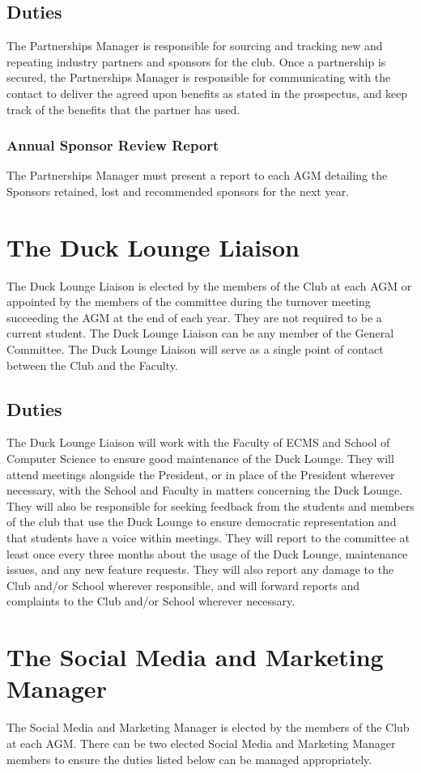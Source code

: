 \documentclass[11pt]{article}
\begin{document}
\subsection{Duties}
The Partnerships Manager is responsible for sourcing and tracking new and repeating industry partners and sponsors for the club.
Once a partnership is secured, the Partnerships Manager is responsible for communicating with the contact to deliver the agreed upon benefits as stated in the prospectus, and keep track of the benefits that the partner has used.
\subsubsection{Annual Sponsor Review Report}
The Partnerships Manager must present a report to each AGM detailing the Sponsors retained, lost and recommended sponsors for the next year.

\section{The Duck Lounge Liaison}
The Duck Lounge Liaison is elected by the members of the Club at each AGM or appointed by the members of the committee during the turnover meeting succeeding the AGM at the end of each year. They are not required to be a current student. The Duck Lounge Liaison can be any member of the General Committee. The Duck Lounge Liaison will serve as a single point of contact between the Club and the Faculty.
\subsection{Duties}
The Duck Lounge Liaison will work with the Faculty of ECMS and School of Computer Science to ensure good maintenance of the Duck Lounge.
They will attend meetings alongside the President, or in place of the President wherever necessary, with the School and Faculty in matters concerning the Duck Lounge.
They will also be responsible for seeking feedback from the students and members of the club that use the Duck Lounge to ensure democratic representation and that students have a voice within meetings.
They will report to the committee at least once every three months about the usage of the Duck Lounge, maintenance issues, and any new feature requests. They will also report any damage to the Club and/or School wherever responsible, and will forward reports and complaints to the Club and/or School wherever necessary.

\section{The Social Media and Marketing Manager}
The Social Media and Marketing Manager is elected by the members of the Club at each AGM. There can be two elected Social Media and Marketing Manager members to ensure the duties listed below can be managed appropriately.
\end{document}
